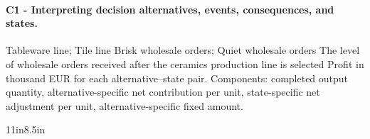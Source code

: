 \paragraph*{C1 - Interpreting decision alternatives, events, consequences, and states.}
\label{subsec:problem4-ceramics-production-line-c1}
\DecisionElementsTable
{Tableware line; Tile line}
{Brisk wholesale orders; Quiet wholesale orders}
{The level of wholesale orders received after the ceramics production line is selected}
{Profit in thousand EUR for each alternative--state pair. Components: completed output quantity, alternative-specific net contribution per unit, state-specific net adjustment per unit, alternative-specific fixed amount.}
\begin{CalculationLandscape}{11in}{8.5in}

\end{CalculationLandscape}
